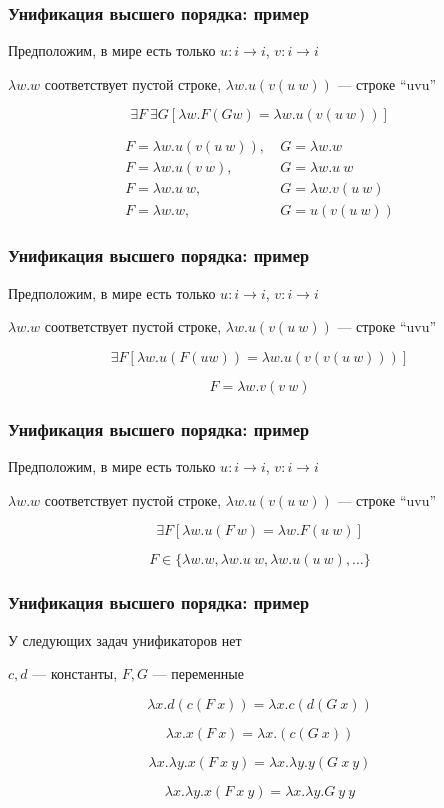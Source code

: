 \documentclass{beamer}
\begin{document}
\begin{frame}[fragile]
  \frametitle{Унификация высшего порядка: пример}

Предположим, в мире есть только $u : i \to i$, $v : i \to i$

$\lambda w . w$ соответствует пустой строке, $\lambda w. u (v (u \ w))$ --- строке ``uvu''

  \[
    \exists F \ \exists G [\lambda w. F (G w) = \lambda w. u (v (u \ w))]
  \]


\begin{align*}
  F = \lambda w. u (v (u \ w)), & \ G = \lambda w. w \\
  F = \lambda w. u (v \ w), & \ G = \lambda w. u \ w \\
  F = \lambda w. u \ w, & \ G = \lambda w. v (u \ w) \\
  F = \lambda w. w, & \ G = u (v (u \ w))
\end{align*}

\end{frame}


\begin{frame}[fragile]
  \frametitle{Унификация высшего порядка: пример}

Предположим, в мире есть только $u : i \to i$, $v : i \to i$

$\lambda w . w$ соответствует пустой строке, $\lambda w. u (v (u \ w))$ --- строке ``uvu''

  \[
    \exists F [\lambda w. u (F (u w)) = \lambda w. u (v (v (u \ w)))]
  \]


\[
  F = \lambda w. v (v \ w)
\]

\end{frame}

\begin{frame}[fragile]
  \frametitle{Унификация высшего порядка: пример}

Предположим, в мире есть только $u : i \to i$, $v : i \to i$

$\lambda w . w$ соответствует пустой строке, $\lambda w. u (v (u \ w))$ --- строке ``uvu''

  \[
    \exists F [\lambda w. u (F \ w) = \lambda w. F (u \ w)]
  \]


\[
  F \in \{\lambda w. w, \lambda w. u \ w, \lambda w. u (u \ w), \dots \}
\]

\end{frame}

\begin{frame}[fragile]
  \frametitle{Унификация высшего порядка: пример}
\begin{center}
У следующих задач унификаторов нет

$c, d$ --- константы, $F, G$ --- переменные
\end{center}

\[ \lambda x. d (c (F \ x)) = \lambda x. c (d (G \ x)) \]

\[ \lambda x. x (F \ x) = \lambda x. (c (G \ x)) \]

\[ \lambda x. \lambda y. x (F \ x \ y) = \lambda x . \lambda y. y (G \ x \ y)\]

\[\lambda x. \lambda y. x (F \ x \ y) = \lambda x. \lambda y. G \ y \ y\]
\end{frame}
\end{document}

